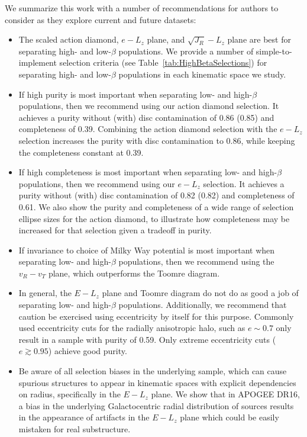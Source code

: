 We summarize this work with a number of recommendations for authors to consider as they explore current and future datasets:

\begin{itemize}
    \item The scaled action diamond, $e-L_{z}$ plane, and $\sqrt{J_{R}}-L_{z}$ plane are best for separating high- and low-$\beta$ populations. We provide a number of simple-to-implement selection criteria (see Table~\ref{tab:HighBetaSelections}) for separating high- and low-$\beta$ populations in each kinematic space we study.
    
	\item If high purity is most important when separating low- and high-$\beta$ populations, then we recommend using our action diamond selection. It achieves a purity without (with) disc contamination of 0.86 (0.85) and completeness of 0.39. Combining the action diamond selection with the $e-L_{z}$ selection increases the purity with disc contamination to 0.86, while keeping the completeness constant at 0.39.
    
    \item If high completeness is most important when separating low- and high-$\beta$ populations, then we recommend using our $e-L_{z}$ selection. It achieves a purity without (with) disc contamination of 0.82 (0.82) and completeness of 0.61. We also show the purity and completeness of a wide range of selection ellipse sizes for the action diamond, to illustrate how completeness may be increased for that selection given a tradeoff in purity.
   
    \item If invariance to choice of Milky Way potential is most important when separating low- and high-$\beta$ populations, then we recommend using the $v_{R}-v_{T}$ plane, which outperforms the Toomre diagram.
    
    \item In general, the $E-L_{z}$ plane and Toomre diagram do not do as good a job of separating low- and high-$\beta$ populations. Additionally, we recommend that caution be exercised using eccentricity by itself for this purpose. Commonly used eccentricity cuts for the radially anisotropic halo, such as $e\sim0.7$ only result in a sample with purity of 0.59. Only extreme eccentricity cuts ($e \gtrsim 0.95$) achieve good purity.
    
    \item Be aware of all selection biases in the underlying sample, which can cause spurious structures to appear in kinematic spaces with explicit dependencies on radius, specifically in the $E-L_{z}$ plane. We show that in APOGEE DR16, a bias in the underlying Galactocentric radial distribution of sources results in the appearance of artifacts in the $E-L_{z}$ plane which could be easily mistaken for real substructure.
\end{itemize}

